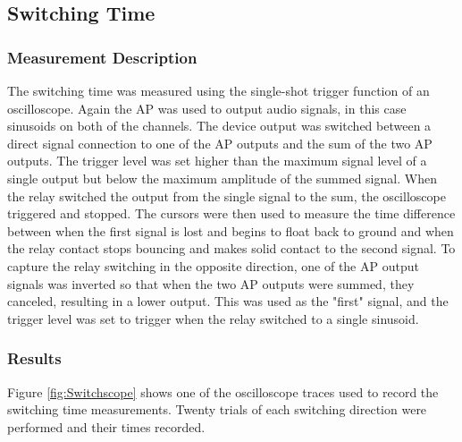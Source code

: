 	\subsection{Switching Time}
		\subsubsection{Measurement Description}
		The switching time was measured using the single-shot trigger function of an oscilloscope.  Again the AP was used to output audio signals, in this case sinusoids on both of the channels.  The device output was switched between a direct signal connection to one of the AP outputs and the sum of the two AP outputs.  The trigger level was set higher than the maximum signal level of a single output but below the maximum amplitude of the summed signal.  When the relay switched the output from the single signal to the sum, the oscilloscope triggered and stopped.  The cursors were then used to measure the time difference between when the first signal is lost and begins to float back to ground and when the relay contact stops bouncing and makes solid contact to the second signal.  To capture the relay switching in the opposite direction, one of the AP output signals was inverted so that when the two AP outputs were summed, they canceled, resulting in a lower output.  This was used as the "first" signal, and the trigger level was set to trigger when the relay switched to a single sinusoid.

		\subsubsection{Results}
		Figure \ref{fig:Switchscope} shows one of the oscilloscope traces used to record the switching time measurements.  Twenty trials of each switching direction were performed and their times recorded.


